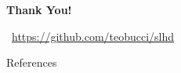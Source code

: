 \documentclass[aspectratio=169,xcolor=dvipsnames,handout]{beamer}
\begin{document}



\begin{frame}
    \Huge{\centerline{\textbf{Thank You!}}}
    \begin{center}
    {\normalsize
    \faGithub\ \url{https://github.com/teobucci/slhd}}    
    \end{center}
\end{frame}


\begin{frame}{References}
    \nocite{Bragazzi2021Burden}
    \nocite{Groenewegen2020Epidemiology}
    \nocite{Zhang2021Electronic}
    \nocite{Lonn2000Regular}
    \printbibliography
\end{frame}



\end{document}
